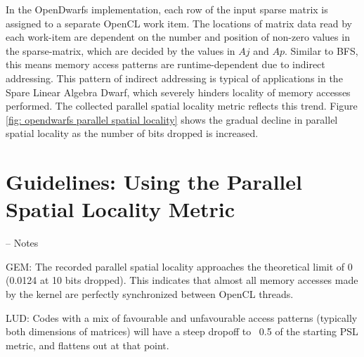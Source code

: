 \documentclass[review=false, sigchi]{acmart}
\begin{document}
	In the OpenDwarfs implementation, each row of the input sparse matrix is assigned to a separate OpenCL work item. 
	The locations of matrix data read by each work-item are dependent on the number and position of non-zero values in the sparse-matrix, which are decided by the values in $Aj$ and $Ap$. 
	Similar to BFS, this means memory access patterns are runtime-dependent due to indirect addressing.
	This pattern of indirect addressing is typical of applications in the Spare Linear Algebra Dwarf, which severely hinders locality of memory accesses performed. The collected parallel spatial locality metric reflects this trend. Figure \ref{fig: opendwarfs parallel spatial locality} shows the gradual decline in parallel spatial locality as the number of bits dropped is increased.
	
	\section{Guidelines: Using the Parallel Spatial Locality Metric}
	
	-- Notes
	
	 GEM: The recorded parallel spatial locality approaches the theoretical limit of 0 (0.0124 at 10 bits dropped). This indicates that almost all memory accesses made by the kernel are perfectly synchronized between OpenCL threads.
	 
	 LUD: Codes with a mix of favourable and unfavourable access patterns (typically both dimensions of matrices) will have a steep dropoff to ~0.5 of the starting PSL metric, and flattens out at that point.
	 
	
	

	
\end{document}
